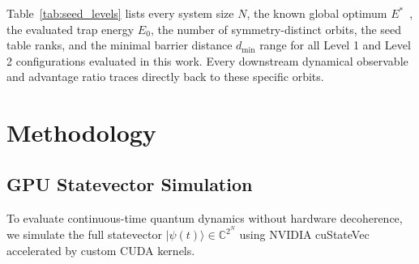 \documentclass[10pt,twocolumn,a4paper]{article}
\begin{document}
Table~\ref{tab:seed_levels} lists every system size $N$, the known global optimum $E^*$~\cite{packebusch2016}, the evaluated trap energy $E_0$, the number of symmetry-distinct orbits, the seed table ranks, and the minimal barrier distance $d_{\min}$ range for all Level 1 and Level 2 configurations evaluated in this work. Every downstream dynamical observable and advantage ratio traces directly back to these specific orbits.

\begin{table}[t]
\centering
\small
\caption{Classification of classical local minima tiers evaluated across system sizes $N \in [20, 30]$. For each $N$, the exact global optimum $E^*$~\cite{packebusch2016} is shown. Level 1 comprises the lowest-energy local traps discovered by classical multi-start steepest descent strictly above $E^*$. Level 2 comprises the next lowest distinct energy tier found. All downstream benchmarks trace directly to these symmetry-distinct orbits.}
\label{tab:seed_levels}
\end{table}

\section{Methodology}
\label{sec:methodology}
\subsection{GPU Statevector Simulation}
To evaluate continuous-time quantum dynamics without hardware decoherence, we simulate the full statevector $|\psi(t)\rangle \in \mathbb{C}^{2^N}$ using NVIDIA cuStateVec~\cite{custatevec} accelerated by custom CUDA kernels.
\end{document}
